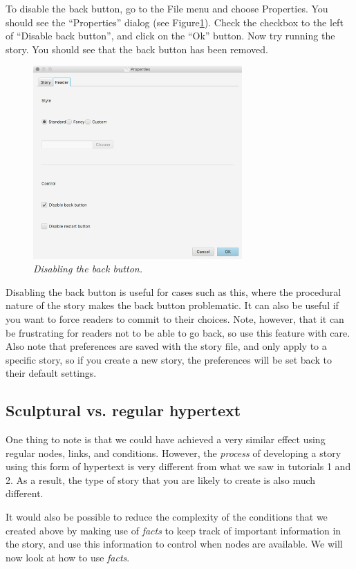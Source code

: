 \documentclass{article}
\begin{document}
To disable the back button, go to the File menu and choose Properties. You should see the ``Properties'' dialog (see Figure\ref{fig:tut3:preferences}). Check the checkbox to the left of ``Disable back button'', and click on the ``Ok'' button. Now try running the story. You should see that the back button has been removed.

\begin{figure}[h]
  \centering
  \includegraphics[width=8cm]{images/hypedyn-tutorial-3-figure-8}
  \caption{\textit{Disabling the back button.}}
  \label{fig:tut3:preferences}
\end{figure} 

Disabling the back button is useful for cases such as this, where the procedural nature of the story makes the back button problematic. It can also be useful if you want to force readers to commit to their choices. Note, however, that it can be frustrating for readers not to be able to go back, so use this feature with care. Also note that preferences are saved with the story file, and only apply to a specific story, so if you create a new story, the preferences will be set back to their default settings.

\subsection{Sculptural vs. regular hypertext}

One thing to note is that we could have achieved a very similar effect using regular nodes, links, and conditions. However, the \textit{process} of developing a story using this form of hypertext is very different from what we saw in tutorials 1 and 2. As a result, the type of story that you are likely to create is also much different.

It would also be possible to reduce the complexity of the conditions that we created above by making use of \textit{facts} to keep track of important information in the story, and use this information to control when nodes are available. We will now look at how to use \textit{facts}.
\end{document}
